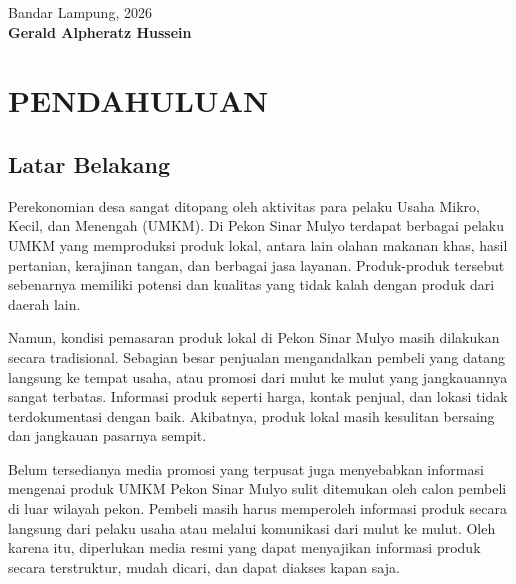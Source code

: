 \documentclass[12pt,a4paper]{article}
\begin{document}
\begin{flushright}

    Bandar Lampung,
    \makebox[3cm]{\dotfill}
    2026
    \\[1.8cm]

    \textbf{Gerald Alpheratz Hussein}

\end{flushright}

\clearpage

\setcounter{page}{1}
\setlength{\parindent}{1.25cm}

\section{PENDAHULUAN}

\subsection{Latar Belakang}

Perekonomian desa sangat ditopang oleh aktivitas para pelaku Usaha
Mikro, Kecil, dan Menengah (UMKM). Di Pekon Sinar Mulyo terdapat
berbagai pelaku UMKM yang memproduksi produk lokal, antara lain
olahan makanan khas, hasil pertanian, kerajinan tangan, dan berbagai
jasa layanan. Produk-produk tersebut sebenarnya memiliki potensi dan
kualitas yang tidak kalah dengan produk dari daerah lain.

Namun, kondisi pemasaran produk lokal di Pekon Sinar Mulyo masih
dilakukan secara tradisional. Sebagian besar penjualan mengandalkan
pembeli yang datang langsung ke tempat usaha, atau promosi dari
mulut ke mulut yang jangkauannya sangat terbatas. Informasi produk
seperti harga, kontak penjual, dan lokasi tidak terdokumentasi
dengan baik. Akibatnya, produk lokal masih kesulitan bersaing dan
jangkauan pasarnya sempit.

Belum tersedianya media promosi yang terpusat juga menyebabkan
informasi mengenai produk UMKM Pekon Sinar Mulyo sulit ditemukan
oleh calon pembeli di luar wilayah pekon. Pembeli masih harus
memperoleh informasi produk secara langsung dari pelaku usaha atau
melalui komunikasi dari mulut ke mulut. Oleh karena itu, diperlukan
media resmi yang dapat menyajikan informasi produk secara
terstruktur, mudah dicari, dan dapat diakses kapan saja.
\end{document}
